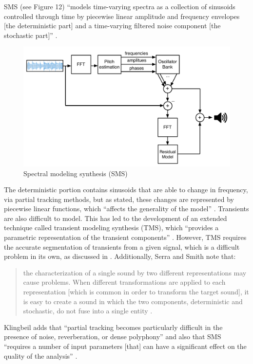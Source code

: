 \documentclass[12pt]{report} 	%
\numberwithin{figure}{chapter}
\numberwithin{table}{chapter}
\numberwithin{equation}{chapter}
\begin{document}
\begin{flushleft}
SMS (see Figure 12) ``models time-varying spectra as a collection of sinusoids controlled through time by piecewise linear amplitude and frequency envelopes [the deterministic part] and a time-varying filtered noise component [the stochastic part]'' \cite[p. 12]{Serra:1990dk}. 
\begin{figure}[h!]
\begin{center}
\includegraphics[scale=0.55]{SMS}
\caption[SMS]{Spectral modeling synthesis (SMS)}
\end{center}
\end{figure}
The deterministic portion contains sinusoids that are able to change in frequency, via partial tracking methods, but as stated, these changes are represented by piecewise linear functions, which ``affects the generality of the model'' \cite[p. 31]{Tolonen:1998bh}. Transients are also difficult to model. This has led to the development of an extended technique called transient modeling synthesis (TMS), which ``provides a parametric representation of the transient components'' \cite[p. 33]{Tolonen:1998bh}. However, TMS requires the accurate segmentation of transients from a given signal, which is a difficult problem in its own, as discussed in \cite[p. 16]{Ciglar:2009uf}. Additionally, Serra and Smith note that:
\begin{singlespace}
\begin{quote}
\selectfont
the characterization of a single sound by two different representations may cause problems. When different transformations are applied to each representation [which is common in order to transform the target sound], it is easy to create a sound in which the two components, deterministic and stochastic, do not fuse into a single entity \cite[p. 23]{Serra:1990dk}.
\end{quote}
\selectfont
\end{singlespace}
Klingbeil adds that ``partial tracking becomes particularly difficult in the presence of noise, reverberation, or dense polyphony'' and also that SMS ``requires a number of input parameters [that] can have a significant effect on the quality of the analysis'' \cite[p. 42]{Klingbeil:2009lo}.


\end{flushleft}
\end{document}
